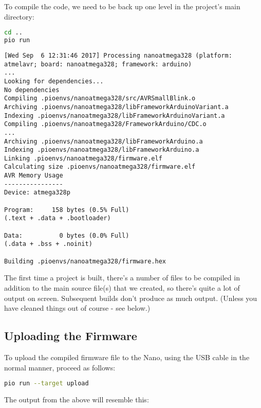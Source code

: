 To compile the code, we need to be back up one level in the project's main directory:

\begin{lstlisting}[language={bash},numbers={none},caption={PIO - Compiling the New Project}]
cd ..
pio run 
\end{lstlisting}    

\begin{lstlisting}[numbers={none},caption={PIO - Compiling the New Project - Output}]
[Wed Sep  6 12:31:46 2017] Processing nanoatmega328 (platform: atmelavr; board: nanoatmega328; framework: arduino)
...
Looking for dependencies...
No dependencies
Compiling .pioenvs/nanoatmega328/src/AVRSmallBlink.o
Archiving .pioenvs/nanoatmega328/libFrameworkArduinoVariant.a
Indexing .pioenvs/nanoatmega328/libFrameworkArduinoVariant.a
Compiling .pioenvs/nanoatmega328/FrameworkArduino/CDC.o
...
Archiving .pioenvs/nanoatmega328/libFrameworkArduino.a
Indexing .pioenvs/nanoatmega328/libFrameworkArduino.a
Linking .pioenvs/nanoatmega328/firmware.elf
Calculating size .pioenvs/nanoatmega328/firmware.elf
AVR Memory Usage
----------------
Device: atmega328p

Program:     158 bytes (0.5% Full)
(.text + .data + .bootloader)

Data:          0 bytes (0.0% Full)
(.data + .bss + .noinit)

Building .pioenvs/nanoatmega328/firmware.hex
\end{lstlisting} 

The first time a project is built, there's a number of files to be compiled in addition to the main source file(s) that we created, so there's quite a lot of output on screen. Subsequent builds don't produce as much output. (Unless you have cleaned things out of course - see below.)


\subsection{Uploading the Firmware}\label{uploading-the-firmware}

To upload the compiled firmware file to the Nano, using the USB cable in the normal manner, proceed as follows:

\begin{lstlisting}[language={bash},numbers={none},caption={PIO - Uploading the Firmware}]
pio run --target upload
\end{lstlisting}    

The output from the above will resemble this:

